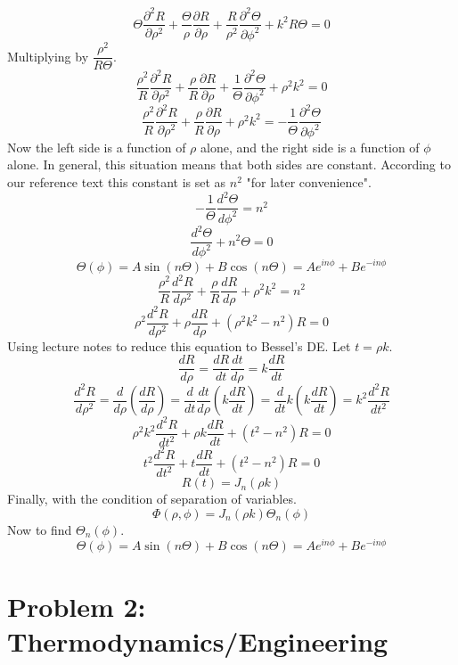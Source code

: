 \documentclass{article}
\begin{document}
{\begin{enumerate}
\[		\]
		\[
			\Theta \frac{\partial^2 R}{\partial \rho^2} + \frac{\Theta}{\rho} \frac{\partial R}{\partial \rho} + \frac{R}{\rho^2} \frac{\partial^2 \Theta}{\partial \phi^2} + k^2 R \Theta = 0
		\]
		Multiplying by $\dfrac{\rho^2}{R \Theta}$.
		\[
			\frac{\rho^2}{R} \frac{\partial^2 R}{\partial \rho^2} + \frac{\rho}{R} \frac{\partial R}{\partial \rho} + \frac{1}{\Theta} \frac{\partial^2 \Theta}{\partial \phi^2} + \rho^2 k^2 = 0
		\]
		\[
			\frac{\rho^2}{R} \frac{\partial^2 R}{\partial \rho^2} + \frac{\rho}{R} \frac{\partial R}{\partial \rho} + \rho^2 k^2 = -\frac{1}{\Theta} \frac{\partial^2 \Theta}{\partial \phi^2}
		\]
		Now the left side is a function of $\rho$ alone, and the right side is a function of $\phi$ alone. In general, this situation means that both sides are constant. According to our reference text this constant is set as $n^2$ "for later convenience".
		\[
			-\frac{1}{\Theta} \frac{d^2 \Theta}{d \phi^2} = n^2
		\]
		\[
			\frac{d^2 \Theta}{d \phi^2} + n^2 \Theta = 0
		\]
		\[
			\Theta(\phi) = A \sin (n \Theta) + B \cos (n \Theta) = Ae^{in\phi} + Be^{-in\phi}
		\]
		\[
			\frac{\rho^2}{R} \frac{d^2 R}{d \rho^2} + \frac{\rho}{R} \frac{d R}{d \rho} + \rho^2 k^2 = n^2
		\]
		\[
			\rho^2 \frac{d^2 R}{d \rho^2} + \rho \frac{d R}{d \rho} + \left(\rho^2 k^2 - n^2\right)R = 0
		\]
		Using lecture notes to reduce this equation to Bessel's DE. Let $t = \rho k$.
		\[
			\frac{dR}{d\rho} = \frac{dR}{dt} \frac{dt}{d\rho} = k \frac{dR}{dt}
		\]
		\[
			\frac{d^2R}{d\rho^2} = \frac{d}{d\rho} \left( \frac{dR}{d\rho} \right) = \frac{d}{dt} \frac{dt}{d\rho} \left( k \frac{dR}{dt} \right) = \frac{d}{dt} k \left( k \frac{dR}{dt} \right) = k^2 \frac{d^2R}{dt^2}
		\]
		\[
			\rho^2 k^2 \frac{d^2 R}{dt^2} + \rho k \frac{d R}{dt} + \left(t^2 - n^2\right)R = 0
		\]
		\[
			t^2 \frac{d^2 R}{dt^2} + t \frac{d R}{dt} + \left(t^2 - n^2\right)R = 0
		\]
		\[
			R(t) = J_n(\rho k)
		\]
		Finally, with the condition of separation of variables.
		\[
			\Phi(\rho, \phi) = J_n(\rho k) \Theta_n(\phi)
		\]
		Now to find $\Theta_n(\phi)$.
		\[
			\Theta(\phi) = A \sin (n \Theta) + B \cos (n \Theta) = Ae^{in\phi} + Be^{-in\phi}
		\]
		
		

	\end{enumerate}
	\unboldmath

	\section*{Problem 2: Thermodynamics/Engineering}
}
\end{document}
